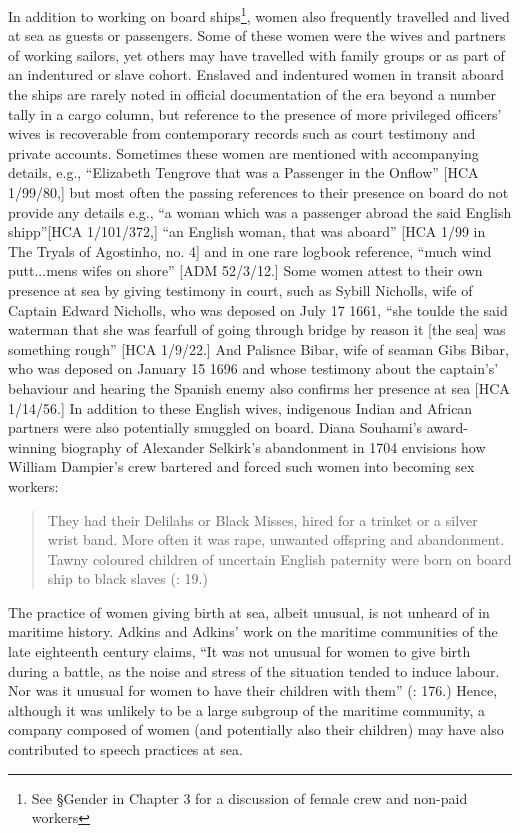 In addition to working on board ships\footnote{See §Gender in Chapter 3 for a discussion of female crew and non-paid workers}, women also frequently travelled and lived at sea as guests or passengers. Some of these women were the wives and partners of working sailors, yet others may have travelled with family groups or as part of an indentured or slave cohort. Enslaved and indentured women in transit aboard the ships are rarely noted in official documentation of the era beyond a number tally in a cargo column, but reference to the presence of more privileged officers’ wives is recoverable from contemporary records such as court testimony and private accounts. Sometimes these women are mentioned with accompanying details, e.g., “Elizabeth Tengrove that was a Passenger in the Onflow” [HCA 1/99/80,] but most often the passing references to their presence on board do not provide any details e.g., “a woman which was a passenger abroad the said English shipp”[HCA 1/101/372,] “an English woman, that was aboard” [HCA 1/99 in The Tryals of Agostinho, no. 4] and in one rare logbook reference, “much wind putt...mens wifes on shore” [ADM 52/3/12.] Some women attest to their own presence at sea by giving testimony in court, such as Sybill Nicholls, wife of Captain Edward Nicholls, who was deposed on July 17 1661, “she toulde the said waterman that she was fearfull of going through bridge by reason it [the sea] was something rough” [HCA 1/9/22.] And Palisnce Bibar, wife of seaman Gibs Bibar, who was deposed on January 15 1696 and whose testimony about the captain's’ behaviour and hearing the Spanish enemy also confirms her presence at sea [HCA 1/14/56.] In addition to these English wives, indigenous Indian and African partners were also potentially smuggled on board. Diana Souhami’s award-winning biography of Alexander Selkirk’s abandonment in 1704 envisions how William Dampier’s crew bartered and forced such women into becoming sex workers:

\begin{quotation}
They had their Delilahs or Black Misses, hired for a trinket or a silver wrist band. More often it was rape, unwanted offspring and abandonment. Tawny coloured children of uncertain English paternity were born on board ship to black slaves (\citealt{Souhami2013}: 19.)\end{quotation}

The practice of women giving birth at sea, albeit unusual, is not unheard of in maritime history. Adkins and Adkins’ work on the maritime communities of the late eighteenth century claims, “It was not unusual for women to give birth during a battle, as the noise and stress of the situation tended to induce labour. Nor was it unusual for women to have their children with them” (\citealt{AdkinsAdkins2008}: 176.) Hence, although it was unlikely to be a large subgroup of the maritime community, a company composed of women (and potentially also their children) may have also contributed to speech practices at sea. 

